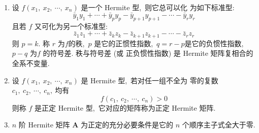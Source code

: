 \begin{enumerate}
		\item 设  $f\left(x_{1},\  x_{2},\  \cdots,\  x_{n}\right)$  是一个 Hermite 型,\  则它总可以化 为如下标准型:
		$$\bar{y}_{1} y_{1}+\cdots+\bar{y}_{p} y_{p}-\bar{y}_{p+1} y_{p+1}-\cdots-\bar{y}_{r} y_{r}$$
		且若 $ f$  又可化为另一个标准型:
		$$\bar{z}_{1} z_{1}+\cdots+\bar{z}_{k} z_{k}-\bar{z}_{k+1} z_{k+1}-\cdots-\bar{z}_{r} z_{r}$$
		则 $ p=k .$ 称  $r$  为$  f  $的秩,\  $ p$  是它的正惯性指数,\  $ q=r-p  $是它的负惯性指数,\ $  p-q $ 为$  f $ 的符号差. 秩与符号差 (或 正负惯性指数) 是 Hermite 矩阵复相合的全系不变量.
		\item 设 $ f\left(x_{1},\  x_{2},\  \cdots,\  x_{n}\right) $ 是 Hermite 型,\  若对任一组不全为 零的复数 $ c_{1},\  c_{2},\  \cdots,\  c_{n} ,\  $均有
		$$f\left(c_{1},\  c_{2},\  \cdots,\  c_{n}\right)>0$$
		则称 $ f$  是正定 Hermite 型,\  它对应的矩阵称为正定 Hermite 矩阵.
		\item  $n$  阶 Hermite 矩阵 $ \boldsymbol{A}$  为正定的充分必要条件是它的  $n $ 个顺序主子式全大于零.

\end{enumerate}
